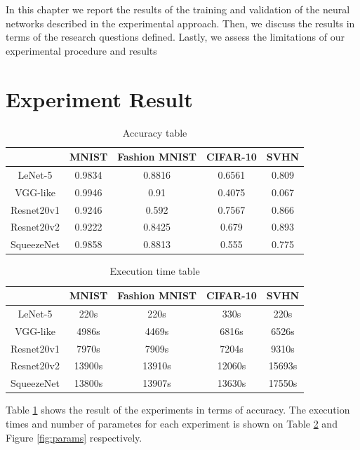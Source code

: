 In this chapter we report the results of the training and validation of the neural networks described in the experimental approach. Then, we discuss the results in terms of the research questions defined. Lastly, we assess the limitations of our experimental procedure and results

\section{Experiment Result}
\begin{table}	
	\centering
	\begin{tabular}{ |c|c|c|c|c| } 
		\hline
		& MNIST & Fashion MNIST & CIFAR-10 & SVHN \\ 
		\hline
		LeNet-5	& 0.9834 & 0.8816 & 0.6561 & 0.809\\
		\hline 
		VGG-like & 0.9946 & 0.91 & 0.4075 & 0.067\\ 
		\hline
		Resnet20v1 & 0.9246 & 0.592 & 0.7567 & 0.866\\ 
		\hline
		Resnet20v2 & 0.9222 & 0.8425 & 0.679 & 0.893\\
		\hline
		SqueezeNet & 0.9858 & 0.8813 & 0.555 & 0.775\\
		\hline
	\end{tabular}
	\caption{Accuracy table}
	\label{tab:accuracy}
\end{table}

\begin{table}
	\centering
	\begin{tabular}{ |c|c|c|c|c| } 
		\hline
		& MNIST & Fashion MNIST & CIFAR-10 & SVHN \\ 
		\hline
		LeNet-5	& 220s & 220s & 330s & 220s\\
		\hline 
		VGG-like & 4986s	& 4469s & 6816s & 6526s\\ 
		\hline
		Resnet20v1 & 7970s & 7909s	& 7204s & 9310s\\ 
		\hline
		Resnet20v2 & 13900s & 	13910s & 	12060s & 	15693s\\
		\hline
		SqueezeNet & 13800s & 	13907s & 	13630s & 	17550s\\
		\hline
	\end{tabular}
	\caption{Execution time table}
	\label{tab:times}
\end{table}
Table \ref{tab:accuracy} shows the result of the experiments in terms of accuracy. The execution times and number of parametes for each experiment is shown on Table \ref{tab:times} and Figure \ref{fig:params} respectively. 

